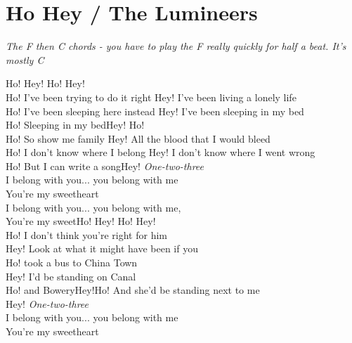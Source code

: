 \section{Ho Hey / The Lumineers}\label{sec:hohey}
\emph{The F then C chords - you have to play the F really quickly for half a beat. It's mostly C}
\Fmajor
\Cmajor
\Gmajor
\Aminor
  
Ho! Hey! Ho! Hey!\\
Ho! I've been trying to do it right Hey! I've been living a lonely life\\
Ho! I've been sleeping here instead Hey! I've been sleeping in my bed\\
Ho! Sleeping in my bedHey! Ho!\\
Ho! So show me family Hey! All the blood that I would bleed\\
Ho! I don't know where I belong Hey! I don't know where I went wrong\\
Ho! But I can write a songHey! \emph{One-two-three}\\
I belong with you... you belong with me\\
You're my sweetheart\\
I belong with you... you belong with me,	\\	
You're my sweetHo! Hey! Ho! Hey!\\
Ho! I don't think you're right for him\\
Hey! Look at what it might have been if you\\
Ho! took a bus to China Town\\
Hey! I'd be standing on Canal\\
Ho! and BoweryHey!Ho! And she'd be standing next to me\\
Hey! \emph{One-two-three}\\
I belong with you... you belong with me\\
You're my sweetheart\\
